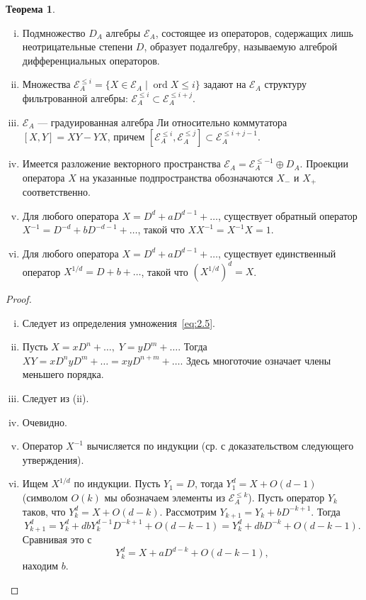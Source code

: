 \documentclass{article}
\theoremstyle{definition}
\newtheorem{theorem}{Теорема}[section]
\theoremstyle{definition} %
\theoremstyle{remark}     %
\theoremstyle{definition}
\theoremstyle{definition}
\theoremstyle{definition}
\theoremstyle{definition}
\theoremstyle{definition}
\theoremstyle{definition}
\theoremstyle{definition}
\theoremstyle{definition}
\begin{document}
\begin{theorem}\label{thm:2.1}
\hfill
\begin{enumerate}[(i)]
\item Подмножество \(D_A\) алгебры \(\mathcal{E}_A\), состоящее из операторов, содержащих лишь неотрицательные степени \(D\), образует подалгебру, называемую алгеброй дифференциальных операторов.

\item Множества \(\mathcal{E}_A^{\leq i} = \{X \in \mathcal{E}_A \mid \operatorname{ord} X \leq i\}\) задают на \(\mathcal{E}_A\) структуру фильтрованной алгебры: \(\mathcal{E}_A^{\leq i} \subset \mathcal{E}_A^{\leq i+j}\).

\item \(\mathcal{E}_A\) — градуированная алгебра Ли относительно коммутатора \([X, Y] = XY - YX\), причем \([\mathcal{E}_A^{\leq i}, \mathcal{E}_A^{\leq j}] \subset \mathcal{E}_A^{\leq i+j-1}\).

\item Имеется разложение векторного пространства \(\mathcal{E}_A = \mathcal{E}_A^{\leq -1} \oplus D_A\). Проекции оператора \(X\) на указанные подпространства обозначаются \(X_-\) и \(X_+\) соответственно.

\item Для любого оператора \(X = D^d + aD^{d-1} + \dots\), существует обратный оператор \(X^{-1} = D^{-d} + bD^{-d-1} + \dots\), такой что \(XX^{-1} = X^{-1}X = 1\).

\item Для любого оператора \(X = D^d + aD^{d-1} + \dots\), существует единственный оператор \(X^{1/d} = D + b + \dots\), такой что \((X^{1/d})^d = X\).
\end{enumerate}
\end{theorem}

\begin{proof} \hfill
\begin{enumerate}[(i)]
\item Следует из определения умножения~\ref{eq:2.5}.
\item Пусть \( X = xD^n + \dots,\; Y = yD^m + \dots \). Тогда \( XY = xD^n yD^m + \dots = xyD^{n+m} + \dots \). Здесь многоточие означает члены меньшего порядка.
\item Следует из (ii).
\item Очевидно.
\item Оператор \( X^{-1} \) вычисляется по индукции (ср. с доказательством следующего утверждения).
\item Ищем \( X^{1/d} \) по индукции. Пусть \( Y_1 = D \), тогда \( Y_1^d = X + O(d-1) \) (символом \( O(k) \) мы обозначаем элементы из \( \mathcal{E}_A^{\leq k} \)). Пусть оператор \( Y_k \) таков, что \( Y_k^d = X + O(d-k) \). Рассмотрим \( Y_{k+1} = Y_k + bD^{-k+1} \). Тогда
\[
Y_{k+1}^d = Y_k^d + db Y_k^{d-1} D^{-k+1} + O(d-k-1) = Y_k^d + db D^{-k} + O(d-k-1).
\]
Сравнивая это с
\[
Y_k^d = X + a D^{d-k} + O(d-k-1),
\]
находим \( b \).
\end{enumerate}
\end{proof}
\end{document}
